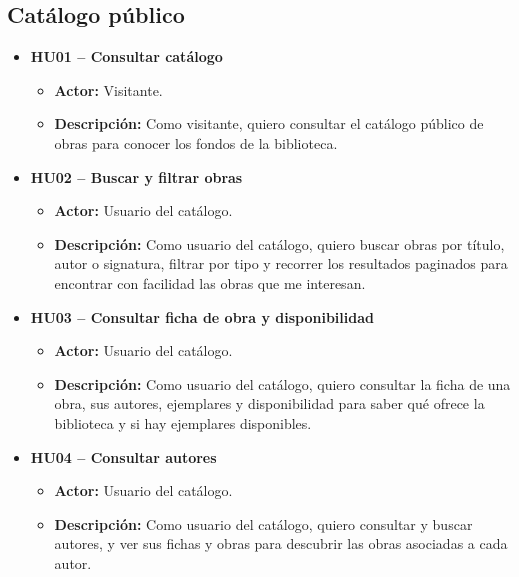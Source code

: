 \subsection{Catálogo público}
\begin{itemize}
	\item \textbf{HU01 -- Consultar catálogo}
	\begin{itemize}
		\item \textbf{Actor:} Visitante.
		\item \textbf{Descripción:} Como visitante, quiero consultar el catálogo público de obras para conocer los fondos de la biblioteca.
	\end{itemize}
	
	\item \textbf{HU02 -- Buscar y filtrar obras}
	\begin{itemize}
		\item \textbf{Actor:} Usuario del catálogo.
		\item \textbf{Descripción:} Como usuario del catálogo, quiero buscar obras por título, autor o signatura, filtrar por tipo y recorrer los resultados paginados para encontrar con facilidad las obras que me interesan.
	\end{itemize}
	
	\item \textbf{HU03 -- Consultar ficha de obra y disponibilidad}
	\begin{itemize}
		\item \textbf{Actor:} Usuario del catálogo.
		\item \textbf{Descripción:} Como usuario del catálogo, quiero consultar la ficha de una obra, sus autores, ejemplares y disponibilidad para saber qué ofrece la biblioteca y si hay ejemplares disponibles.
	\end{itemize}
	
	\item \textbf{HU04 -- Consultar autores}
	\begin{itemize}
		\item \textbf{Actor:} Usuario del catálogo.
		\item \textbf{Descripción:} Como usuario del catálogo, quiero consultar y buscar autores, y ver sus fichas y obras para descubrir las obras asociadas a cada autor.
	\end{itemize}
\end{itemize}


